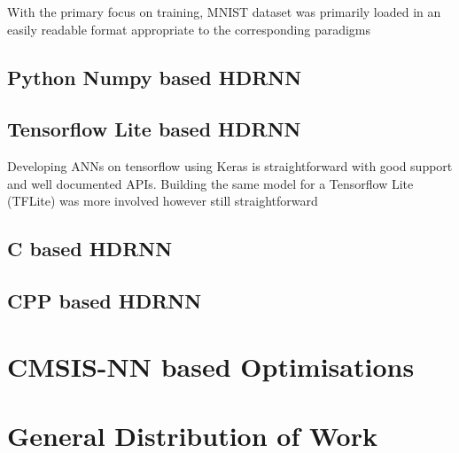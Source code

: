 With the primary focus on training, MNIST dataset was primarily loaded in an easily readable format appropriate to the corresponding paradigms

\subsection[Python - Numpy]{Python Numpy based HDRNN}

\subsection[Tensorflow Lite]{Tensorflow Lite based HDRNN}

Developing ANNs on tensorflow using Keras is straightforward with good support and well documented APIs. Building the same model for a Tensorflow Lite (TFLite) was more involved however still straightforward

\subsection[C]{C based HDRNN}

\subsection[CPP - Eigen]{CPP based HDRNN}

\section{CMSIS-NN based Optimisations}
\textit{}

\section{General Distribution of Work}
